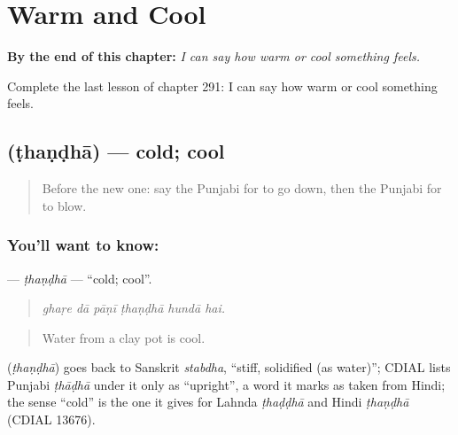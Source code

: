 
\chapter{Warm and Cool}
\label{ch:pa-a2-warm-and-cool}

\begin{chapteropening}
\textbf{By the end of this chapter:} \emph{I can say how warm or cool something feels.}

Complete the last lesson of chapter 291: I can say how warm or cool something feels.
\end{chapteropening}

\section[\texorpdfstring{\pa{ਠੰਢਾ} (ṭhaṇḍhā)}{ਠੰਢਾ (ṭhaṇḍhā)}]{ (ṭhaṇḍhā) — cold; cool}

\label{lesson:PA-C291-thandha}



\begin{quote}
Before the new one: say the Punjabi for to go down, then the Punjabi for to blow.
\end{quote}

\subsection*{You'll want to know: }
\textbf{} — \emph{ṭhaṇḍhā} — \textquotedblleft{}cold; cool\textquotedblright{}.

\begin{quote}
     
\end{quote}

\begin{quote}
\emph{ghaṛe dā pāṇī ṭhaṇḍhā hundā hai.}
\end{quote}

\begin{quote}
Water from a clay pot is cool.
\end{quote}

\begin{cousinweb}
\textbf{} (\emph{ṭhaṇḍhā}) goes back to Sanskrit \emph{stabdha}, \textquotedblleft{}stiff, solidified (as water)\textquotedblright{}; CDIAL lists Punjabi \emph{ṭhāḍhā} under it only as \textquotedblleft{}upright\textquotedblright{}, a word it marks as taken from Hindi; the sense \textquotedblleft{}cold\textquotedblright{} is the one it gives for Lahnda \emph{ṭhaḍḍhā} and Hindi \emph{ṭhaṇḍhā} (CDIAL 13676).
\end{cousinweb}

